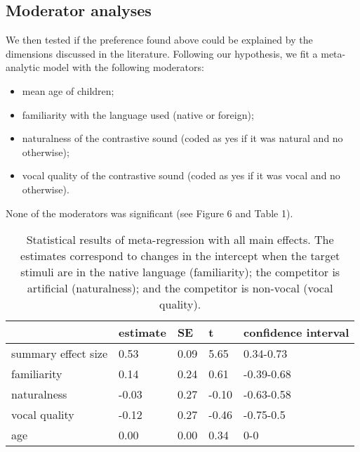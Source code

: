 \documentclass[man,floatsintext]{apa6}
\providecommand{\tightlist}{%
  \setlength{\itemsep}{0pt}\setlength{\parskip}{0pt}}
\begin{document}
\hypertarget{moderator-analyses}{%
\subsection{Moderator analyses}\label{moderator-analyses}}

We then tested if the preference found above could be explained by the dimensions discussed in the literature. Following our hypothesis, we fit a meta-analytic model with the following moderators:

\begin{itemize}
\tightlist
\item
  mean age of children;
\item
  familiarity with the language used (native or foreign);
\item
  naturalness of the contrastive sound (coded as yes if it was natural and no otherwise);
\item
  vocal quality of the contrastive sound (coded as yes if it was vocal and no otherwise).
\end{itemize}

None of the moderators was significant (see Figure 6 and Table 1).

\begin{table}[tbp]

\begin{center}
\begin{threeparttable}

\caption{\label{tab:Table1}Statistical results of meta-regression with all main effects. The estimates correspond to changes in the intercept when the target stimuli are in the native language (familiarity); the competitor is artificial (naturalness); and the competitor is non-vocal (vocal quality).}

\begin{tabular}{lllll}
\toprule
 & estimate & SE & t & confidence interval\\
\midrule
summary effect size & 0.53 & 0.09 & 5.65 & 0.34-0.73\\
familiarity & 0.14 & 0.24 & 0.61 & -0.39-0.68\\
naturalness & -0.03 & 0.27 & -0.10 & -0.63-0.58\\
vocal quality & -0.12 & 0.27 & -0.46 & -0.75-0.5\\
age & 0.00 & 0.00 & 0.34 & 0-0\\
\bottomrule
\end{tabular}

\end{threeparttable}
\end{center}

\end{table}
\end{document}
